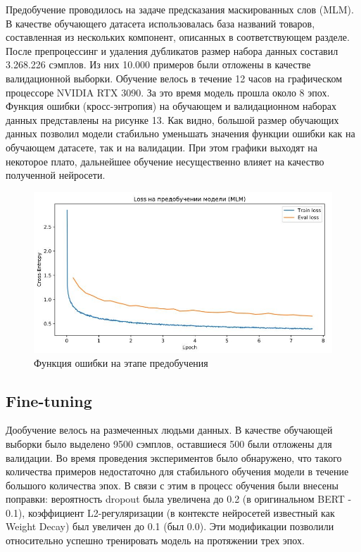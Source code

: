 \documentclass[12pt,a4paper]{article}
\begin{document}
Предобучение проводилось на задаче предсказания маскированных слов (MLM). В качестве обучающего датасета использовалась база названий товаров, составленная из нескольких компонент, описанных в соответствующем разделе. После препроцессинг и удаления дубликатов размер набора данных составил 3.268.226 сэмплов. Из них 10.000 примеров были отложены в качестве валидационной выборки. Обучение велось в течение 12 часов на графическом процессоре NVIDIA RTX 3090. За это время модель прошла около 8 эпох. Функция ошибки (кросс-энтропия) на обучающем и валидационном наборах данных представлены на рисунке 13. Как видно, большой размер обучающих данных позволил модели стабильно уменьшать значения функции ошибки как на обучающем датасете, так и на валидации. При этом графики выходят на некоторое плато, дальнейшее обучение несущественно влияет на качество полученной нейросети.

\begin{figure}[H]
	\begin{center}
		\includegraphics[scale=0.4]{loss_pretrain.jpg}
	\end{center}
	\caption{Функция ошибки на этапе предобучения}
\end{figure}

\noindent 

\subsection{Fine-tuning}

Дообучение велось на размеченных людьми данных. В качестве обучающей выборки было выделено 9500 сэмплов, оставшиеся 500 были отложены для валидации. Во время проведения экспериментов было обнаружено, что такого количества примеров недостаточно для стабильного обучения модели в течение большого количества эпох. В связи с этим в процесс обучения были внесены поправки: вероятность dropout была увеличена до 0.2 (в оригинальном BERT - 0.1), коэффициент L2-регуляризации (в контексте нейросетей известный как Weight Decay) был увеличен до 0.1 (был 0.0). Эти модификации позволили относительно успешно тренировать модель на протяжении трех эпох.
\end{document}
